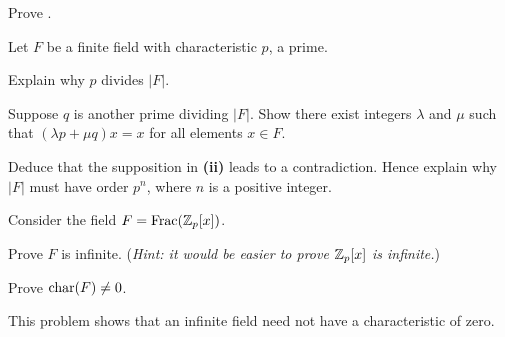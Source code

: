 \begin{problem}\label{problem-homomorphism-from-field-is-injective-or-trivial}
    Prove .
\end{problem}

\begin{problem}\label{problem-finite-field-has-prime-power-order}
    Let $F$ be a finite field with characteristic $p$, a prime.
    \begin{partquestions}{\roman*}
        \item Explain why $p$ divides $|F|$.
        \item Suppose $q$ is another prime dividing $|F|$. Show there exist integers $\lambda$ and $\mu$ such that $(\lambda p + \mu q)x = x$ for all elements $x \in F$.
        \item Deduce that the supposition in \textbf{(ii)} leads to a contradiction. Hence explain why $|F|$ must have order $p^n$, where $n$ is a positive integer.
    \end{partquestions}
\end{problem}

\begin{problem}
    Consider the field $F = \mathrm{Frac}(\mathbb{Z}_p[x])$.
    \begin{partquestions}{\alph*}
        \item Prove $F$ is infinite.\newline
        (\textit{Hint: it would be easier to prove $\mathbb{Z}_p[x]$ is infinite.})
        \item Prove $\mathrm{char}(F) \neq 0$.
    \end{partquestions}
\end{problem}
\begin{remark}
    This problem shows that an infinite field need not have a characteristic of zero.
\end{remark}
